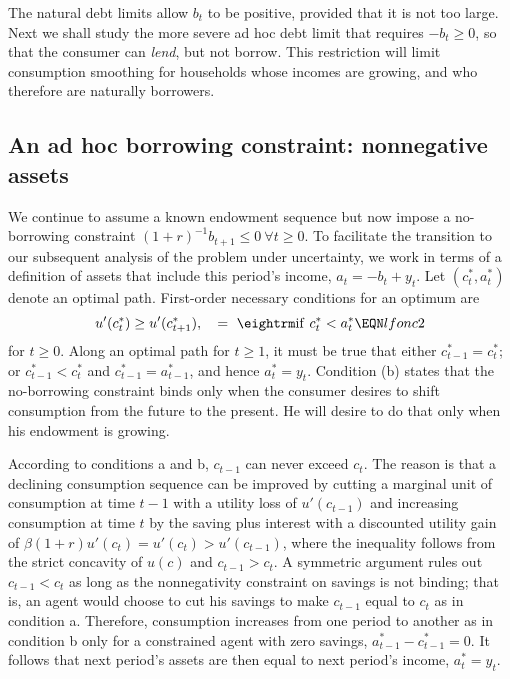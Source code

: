 The natural debt limits allow $b_t$ to be positive, provided that
it is not too large. Next we shall study the more severe ad hoc
debt limit that requires $- b_t \geq 0$, so that the consumer can
{\it lend\/}, but not borrow.  This restriction will limit consumption smoothing
for households whose incomes are growing, and  who therefore are
naturally borrowers.

\subsection{An ad hoc borrowing constraint: nonnegative assets}\label{sec:ad_hoc_borrowing}%
We continue to assume a known endowment sequence but
 now impose a no-borrowing constraint
$(1+r)^{-1} b_{t+1}  \leq 0  \
 \forall t \geq 0$.  To facilitate the transition to our subsequent
analysis of the problem under uncertainty, we work in terms of a
definition of assets that include this period's income, $a_t =
-b_t+y_t$. Let $(c_t^*, a_t^*)$ denote an
optimal path. First-order necessary conditions for an optimum are
$$ u'(c_t^*) \geq u'(c_{t+1}^*),  \quad = \ {\rm if} \ c_t^* < a_t^*
 \EQN lfonc2 $$
for $t\geq 0$.
Along an optimal path for $t \geq 1$, it must be true that either
\medskip
{} $c^*_{t-1} = c^*_t$; or
 $c^*_{t-1} < c^*_t$ and $c^*_{t-1} = a^*_{t-1}$,
and hence $a^*_{t} = y_t$.
\medskip
\noindent
Condition (b) states that the no-borrowing constraint binds only when
the consumer desires to shift consumption from the future to the present.
He will desire to do that only when his endowment is
growing.

According to conditions a and b, $c_{t-1}$ can never exceed $c_t$.
The reason is that a declining consumption sequence can be
improved by cutting a marginal unit of
consumption at time $t-1$ with a utility loss of $u'(c_{t-1})$
and increasing consumption at time $t$ by the saving plus
interest with a discounted utility gain of
$\beta (1+r) u'(c_t) = u'(c_t) >  u'(c_{t-1})$, where the
inequality follows from the strict concavity of $u(c)$ and
$c_{t-1}>c_t$. A symmetric argument rules out
$c_{t-1}<c_t$ as long as the nonnegativity constraint on savings
is not binding; that is, an agent would choose to cut his savings
to make $c_{t-1}$ equal to $c_t$ as in condition a. Therefore,
consumption increases from one period to another as in condition b
only for a constrained agent with zero savings,
$a^*_{t-1}-c^*_{t-1}=0$. It follows that next period's assets
are then equal to next period's income, $a^*_t = y_t$.

